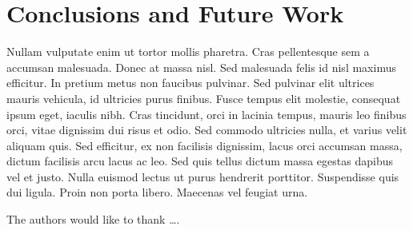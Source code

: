 \section{Conclusions and Future Work}

Nullam vulputate enim ut tortor mollis pharetra. Cras pellentesque sem a accumsan malesuada. Donec at massa nisl. Sed malesuada felis id nisl maximus efficitur. In pretium metus non faucibus pulvinar. Sed pulvinar elit ultrices mauris vehicula, id ultricies purus finibus. Fusce tempus elit molestie, consequat ipsum eget, iaculis nibh. Cras tincidunt, orci in lacinia tempus, mauris leo finibus orci, vitae dignissim dui risus et odio. Sed commodo ultricies nulla, et varius velit aliquam quis. Sed efficitur, ex non facilisis dignissim, lacus orci accumsan massa, dictum facilisis arcu lacus ac leo. Sed quis tellus dictum massa egestas dapibus vel et justo. Nulla euismod lectus ut purus hendrerit porttitor. Suspendisse quis dui ligula. Proin non porta libero. Maecenas vel feugiat urna.

\begin{acks}
The authors would like to thank \dots.
\end{acks}